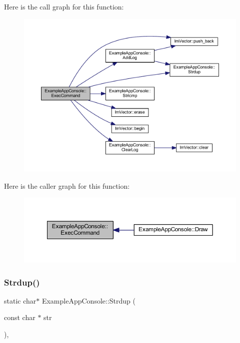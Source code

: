 Here is the call graph for this function\+:
\nopagebreak
\begin{figure}[H]
\begin{center}
\leavevmode
\includegraphics[width=350pt]{struct_example_app_console_aa1e8bf1f3795cbc41597e1ff081c6589_cgraph}
\end{center}
\end{figure}
Here is the caller graph for this function\+:
\nopagebreak
\begin{figure}[H]
\begin{center}
\leavevmode
\includegraphics[width=350pt]{struct_example_app_console_aa1e8bf1f3795cbc41597e1ff081c6589_icgraph}
\end{center}
\end{figure}
\mbox{\label{struct_example_app_console_a61d0da41ef31ea8690b23681a1e54dba}} 
\subsubsection{\texorpdfstring{Strdup()}{Strdup()}}
{\footnotesize\ttfamily static char$\ast$ Example\+App\+Console\+::\+Strdup (\begin{DoxyParamCaption}\item[{const char $\ast$}]{str }\end{DoxyParamCaption})\hspace{0.3cm}{\ttfamily [inline]}, {\ttfamily [static]}}

